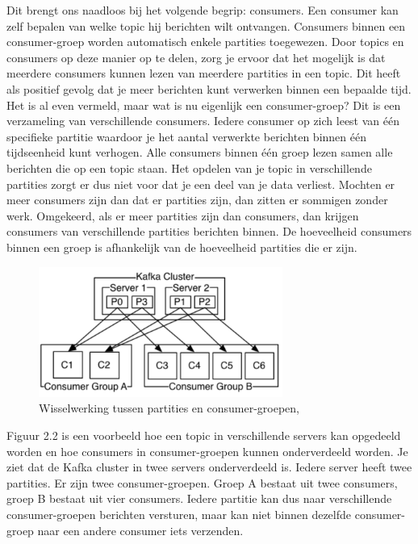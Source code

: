 Dit brengt ons naadloos bij het volgende begrip: consumers. Een consumer kan zelf bepalen van welke topic hij berichten wilt ontvangen. Consumers binnen een consumer-groep worden automatisch enkele partities toegewezen. Door topics en consumers op deze manier op te delen, zorg je ervoor dat het mogelijk is dat meerdere consumers kunnen lezen van meerdere partities in een topic. Dit heeft als positief gevolg dat je meer berichten kunt verwerken binnen een bepaalde tijd. Het is al even vermeld, maar wat is nu eigenlijk een consumer-groep? Dit is een verzameling van verschillende consumers. Iedere consumer op zich leest van één specifieke partitie waardoor je het aantal verwerkte berichten binnen één tijdseenheid kunt verhogen. Alle consumers binnen één groep lezen samen alle berichten die op een topic staan. Het opdelen van je topic in verschillende partities zorgt er dus niet voor dat je een deel van je data verliest. Mochten er meer consumers zijn dan dat er partities zijn, dan zitten er sommigen zonder werk. Omgekeerd, als er meer partities zijn dan consumers, dan krijgen consumers van verschillende partities berichten binnen. De hoeveelheid consumers binnen een groep is afhankelijk van de hoeveelheid partities die er zijn.

 \begin{figure}[h!]
    \centering
    \includegraphics[width=80mm]{../kafkaConsumers.png}
    \caption{Wisselwerking tussen partities en consumer-groepen, \autocite{Sookocheff2015}}
    
\end{figure}

Figuur 2.2 is een voorbeeld hoe een topic in verschillende servers kan opgedeeld worden en hoe consumers in consumer-groepen kunnen onderverdeeld worden. Je ziet dat de Kafka cluster in twee servers onderverdeeld is. Iedere server heeft twee partities. Er zijn twee consumer-groepen. Groep A bestaat uit twee consumers, groep B bestaat uit vier consumers. Iedere partitie kan dus naar verschillende consumer-groepen berichten versturen, maar kan niet binnen dezelfde consumer-groep naar een andere consumer iets verzenden. 

